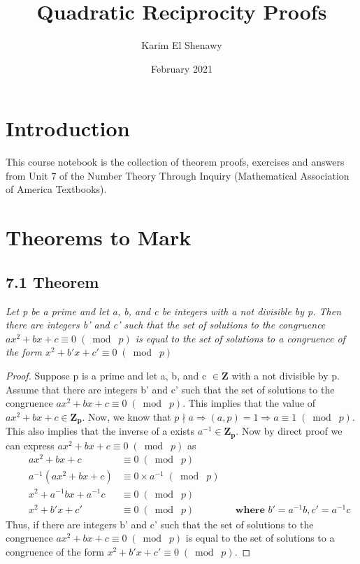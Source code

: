 \documentclass{article}
\title{Quadratic Reciprocity Proofs}
\author{Karim El Shenawy}
\date{February 2021}
\begin{document}
\maketitle

\section*{Introduction}
This course notebook is the collection of theorem proofs, exercises and answers from Unit 7 of the Number Theory Through Inquiry (Mathematical Association of America Textbooks).

\section*{Theorems to Mark}

\subsection*{7.1 Theorem} 
\quad \textit{Let p be a prime and let a, b, and c be integers with a not divisible by p. Then there are integers b' and c' such that the set of solutions to the congruence $ax^2 + bx + c \equiv 0 \;(\bmod\; p)$ is equal to the set of solutions to a congruence of the form $x^2+b'x+c' \equiv 0 \;(\bmod\; p)$}

\begin{proof}
Suppose p is a prime and let a, b, and c $\in \mathbf{Z}$ with a not divisible by p. Assume that there are integers b' and c' such that the set of solutions to the congruence $ax^2 + bx + c \equiv 0 \;(\bmod\; p)$. This implies that the value of $ax^2 + bx + c \in \mathbf{Z_p}$. Now, we know that $p \nmid a \Longrightarrow (a,p) = 1 \Longrightarrow a \equiv 1 \;(\bmod\; p)$. This also implies that the inverse of a exists $a^{-1} \in \mathbf{Z_p}$. Now by direct proof we can express $ax^2 + bx + c \equiv 0 \;(\bmod\; p)$ as
\begin{align*}
    && ax^2 + bx + c &\equiv 0 \;(\bmod\; p) &&\\
    && a^{-1}(ax^2 + bx + c) &\equiv 0\times a^{-1} \;(\bmod\; p) &&\\
    && x^2 + a^{-1}bx + a^{-1}c &\equiv 0 \;(\bmod\; p) &&\\
    && x^2 +b'x + c' &\equiv 0 \;(\bmod\; p) && \textbf{where $b' = a^{-1}b, c' = a^{-1}c$}
\end{align*}
Thus, if there are integers b' and c' such that the set of solutions to the congruence $ax^2 + bx + c \equiv 0 \;(\bmod\; p)$ is equal to the set of solutions to a congruence of the form $x^2+b'x+c' \equiv 0 \;(\bmod\; p)$.
\end{proof}
\end{document}
